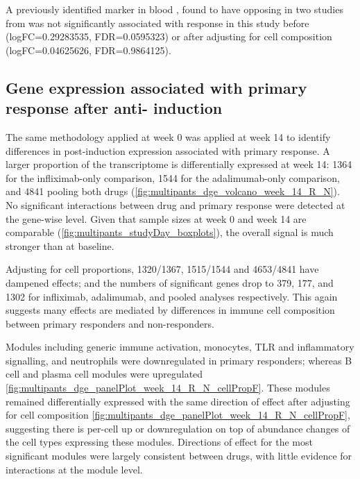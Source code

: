 \begin{outline}
A previously identified marker in blood , found to have opposing in two studies from \autocite{gaujoux2019CellcentredMetaanalysisReveals,verstockt2019LowTREM1Expression}
was not significantly associated with response in this study
before (logFC=\num{0.29283535}, FDR=\num{0.0595323})
or after adjusting for cell composition (logFC=\num{0.04625626}, FDR=\num{0.9864125}).


\subsection{Gene expression associated with primary response after anti- induction}

The same methodology applied at week 0 was applied at week 14 to identify differences in post-induction expression associated with primary response.
A larger proportion of the transcriptome is differentially expressed at week 14: 
1364 for the infliximab-only comparison, 
1544 for the adalimumab-only comparison, 
and 4841 pooling both drugs (\autoref{fig:multipants_dge_volcano_week_14_R_N}).
No significant interactions between drug and primary response were detected at the gene-wise level.
Given that sample sizes at week 0 and week 14 are comparable (\autoref{fig:multipants_studyDay_boxplots}), the overall signal is much stronger than at baseline.

Adjusting for cell proportions, 1320/1367, 1515/1544 and 4653/4841 have dampened effects;
and the numbers of significant genes drop to 379, 177, and 1302 for infliximab, adalimumab, and pooled analyses respectively.
This again suggests many effects are mediated by differences in immune cell composition between primary responders and non-responders.

Modules including generic immune activation, monocytes, TLR and inflammatory signalling, and neutrophils were downregulated in primary responders; 
whereas B cell and plasma cell modules were upregulated \autoref{fig:multipants_dge_panelPlot_week_14_R_N_cellPropF}.
These modules remained differentially expressed with the same direction of effect after adjusting for cell composition \autoref{fig:multipants_dge_panelPlot_week_14_R_N_cellPropF}, 
suggesting there is per-cell up or downregulation on top of abundance changes of the cell types expressing these modules.
Directions of effect for the most significant modules were largely consistent between drugs, with little evidence for interactions at the module level.


\end{outline}
